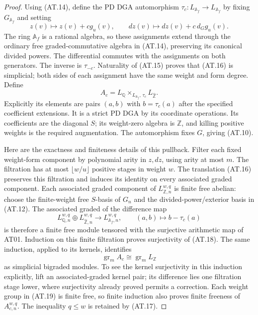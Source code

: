 \begin{proof}
Using (AT.14), define the PD DGA automorphism
$\tau_c:L_{\mathbb A_f}\to L_{\mathbb A_f}$
by fixing $G_{\mathbb A_f}$ and setting
\[
 z(v)\longmapsto z(v)+c g_u(v),\qquad
 dz(v)\longmapsto dz(v)+c\,d_Gg_u(v).
 \tag{AT.16}
\]
The ring $\mathbb A_f$ is a rational algebra, so
these assignments extend through the ordinary free
graded-commutative algebra in (AT.14), preserving
its canonical divided powers. The differential
commutes with the assignments on both generators.
The inverse is $\tau_{-c}$. Naturality of (AT.15)
proves that (AT.16) is simplicial; both sides of
each assignment have the same weight and form
degree. Define
\[
 A_c=L_{\mathbb Q}
       \mathop{\times}_{L_{\mathbb A_f},\,\tau_c}
       L_{\widehat{\mathbb Z}}.
 \tag{AT.17}
\]
Explicitly its elements are pairs $(a,b)$ with
$b=\tau_c(a)$ after the specified coefficient
extensions. It is a strict PD DGA by its coordinate
operations. Its coefficients are the diagonal $S$;
its weight-zero algebra is $\mathbb Z$, and killing
positive weights is the required augmentation.
The automorphism fixes $G$, giving (AT.10).

Here are the exactness and finiteness details of this
pullback. Filter each fixed weight-form component
by polynomial arity in $z,dz$, using arity at most
$m$. The filtration has at most $\lfloor w/u\rfloor$
positive stages in weight $w$.
The translation (AT.16) preserves this filtration
and induces its identity on every associated graded
component. Each associated graded component of
$L_{\mathbb Z,n}^{w,q}$ is finite free abelian:
choose the finite-weight free $S$-basis of $G_n$
and the divided-power/exterior basis in (AT.12).
The associated graded of the difference map
\[
 L_{\mathbb Q,n}^{w,q}\oplus
 L_{\widehat{\mathbb Z},n}^{w,q}
 \longrightarrow L_{\mathbb A_f,n}^{w,q},
 \qquad(a,b)\longmapsto b-\tau_c(a)
 \tag{AT.18}
\]
is therefore a finite free module tensored with
the surjective arithmetic map of AT01. Induction
on this finite filtration proves surjectivity of
(AT.18). The same induction, applied to its kernels,
identifies
\[
 \operatorname{gr}_m A_c
      \cong\operatorname{gr}_m L_{\mathbb Z}
 \tag{AT.19}
\]
as simplicial bigraded modules. To see the kernel
surjectivity in this induction explicitly, lift an
associated-graded kernel pair; its difference lies
one filtration stage lower, where surjectivity
already proved permits a correction. Each weight
group in (AT.19) is finite free, so finite induction
also proves finite freeness of $A_{c,n}^{w,q}$.
The inequality $q\leq w$ is retained by (AT.17).


\end{proof}
